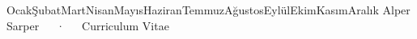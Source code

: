\documentclass[11pt, a4paper]{awesome-cv}
\begin{document}
\makecvheader

\renewcommand{\today}{\number\day\space\ifcase\month\or Ocak\or Şubat\or Mart\or Nisan\or Mayıs\or Haziran\or Temmuz\or Ağustos\or Eylül\or Ekim\or Kasım\or Aralık\fi\space\number\year}

\makecvfooter
  {\today}
  {Alper Sarper~~~·~~~Curriculum Vitae}
  {\thepage}






% 
% 
% 
% 
% 
% 



\newpage




\end{document}
